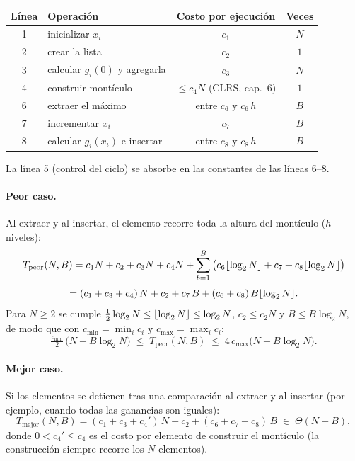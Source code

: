 \begin{center}
\begin{tabular}{clcc}
\toprule
\rowcolor{uccielo} \textbf{Línea} & \textbf{Operación} & \textbf{Costo por ejecución} & \textbf{Veces} \\
\midrule
1 & inicializar $x_i$ & $c_1$ & $N$ \\
2 & crear la lista & $c_2$ & $1$ \\
3 & calcular $g_i(0)$ y agregarla & $c_3$ & $N$ \\
4 & construir montículo & $\le c_4 N$ (CLRS, cap.~6) & $1$ \\
6 & extraer el máximo & entre $c_6$ y $c_6\,h$ & $B$ \\
7 & incrementar $x_i$ & $c_7$ & $B$ \\
8 & calcular $g_i(x_i)$ e insertar & entre $c_8$ y $c_8\,h$ & $B$ \\
\bottomrule
\end{tabular}
\end{center}

La línea 5 (control del ciclo) se absorbe en las constantes de las líneas 6--8.

\paragraph{Peor caso.} Al extraer y al insertar, el elemento recorre toda la altura del montículo ($h$ niveles):
\[
T_{\text{peor}}(N,B) = c_1N + c_2 + c_3N + c_4N + \sum_{b=1}^{B}\big(c_6\lfloor\log_2 N\rfloor + c_7 + c_8\lfloor\log_2 N\rfloor\big)
\]
\[
= (c_1+c_3+c_4)\,N + c_2 + c_7\,B + (c_6+c_8)\,B\lfloor\log_2 N\rfloor.
\]
Para $N\ge 2$ se cumple $\tfrac12\log_2 N \le \lfloor\log_2N\rfloor\le\log_2N$, $c_2\le c_2N$ y $B\le B\log_2N$, de modo que con $c_{\min}=\min_i c_i$ y $c_{\max}=\max_i c_i$:
\[
\tfrac{c_{\min}}{2}\,\big(N + B\log_2 N\big) \;\le\; T_{\text{peor}}(N,B) \;\le\; 4\,c_{\max}\big(N + B\log_2 N\big).
\]

\paragraph{Mejor caso.} Si los elementos se detienen tras una comparación al extraer y al insertar (por ejemplo, cuando todas las ganancias son iguales):
\[
T_{\text{mejor}}(N,B) = (c_1 + c_3 + c_4')\,N + c_2 + (c_6+c_7+c_8)\,B \;\in\; \Theta(N + B),
\]
donde $0<c_4'\le c_4$ es el costo por elemento de construir el montículo (la construcción siempre recorre los $N$ elementos).

